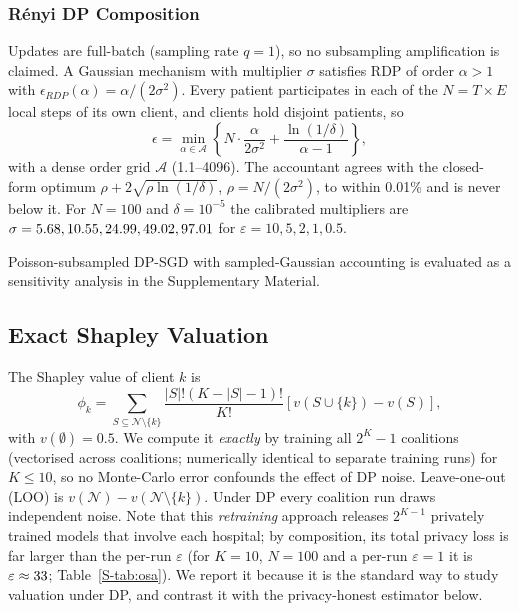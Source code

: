 \documentclass[journal]{IEEEtran}
\begin{document}
\subsubsection{Rényi DP Composition}
Updates are full-batch (sampling rate $q=1$), so no subsampling amplification is claimed. A Gaussian mechanism with multiplier $\sigma$ satisfies RDP of order $\alpha>1$ with $\epsilon_{RDP}(\alpha) = \alpha/(2\sigma^2)$. Every patient participates in each of the $N = T \times E$ local steps of its own client, and clients hold disjoint patients, so
\begin{equation}
\epsilon = \min_{\alpha \in \mathcal{A}} \left\{ N \cdot \frac{\alpha}{2 \sigma^2} + \frac{\ln(1/\delta)}{\alpha - 1} \right\},
\end{equation}
with a dense order grid $\mathcal{A}$ (1.1--4096). The accountant agrees with the closed-form optimum $\rho + 2\sqrt{\rho \ln(1/\delta)}$, $\rho = N/(2\sigma^2)$, to within 0.01\% and is never below it. For $N=100$ and $\delta=10^{-5}$ the calibrated multipliers are $\sigma = 5.68, 10.55, 24.99, 49.02, 97.01$ for $\varepsilon = 10, 5, 2, 1, 0.5$.

Poisson-subsampled DP-SGD with sampled-Gaussian accounting is evaluated as a sensitivity analysis in the Supplementary Material.



\subsection{Exact Shapley Valuation}
The Shapley value of client $k$ is
\begin{equation}
\phi_k = \sum_{S \subseteq \mathcal{N} \setminus \{k\}} \frac{|S|!(K - |S| - 1)!}{K!} \left[ v(S \cup \{k\}) - v(S) \right],
\end{equation}
with $v(\emptyset)=0.5$. We compute it \emph{exactly} by training all $2^K-1$ coalitions (vectorised across coalitions; numerically identical to separate training runs) for $K \le 10$, so no Monte-Carlo error confounds the effect of DP noise. Leave-one-out (LOO) is $v(\mathcal{N}) - v(\mathcal{N}\setminus\{k\})$. Under DP every coalition run draws independent noise. Note that this \emph{retraining} approach releases $2^{K-1}$ privately trained models that involve each hospital; by composition, its total privacy loss is far larger than the per-run $\varepsilon$ (for $K=10$, $N=100$ and a per-run $\varepsilon=1$ it is $\varepsilon\approx33$; Table~\ref{S-tab:osa}). We report it because it is the standard way to study valuation under DP, and contrast it with the privacy-honest estimator below.
\end{document}
